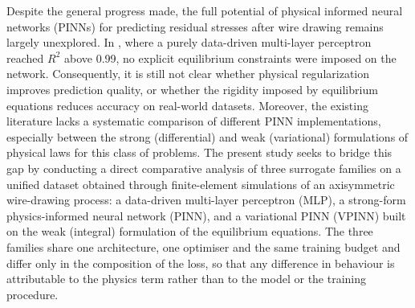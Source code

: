 \documentclass[subscriptcorrection,upint,varvw,barcolor=Goldenrod3,mathalfa=cal=euler,balance,hyphenate,french,pdf-a]{asmejour} %
\begin{document}
Despite the general progress made, the full potential of physical informed neural networks (PINNs) for predicting residual stresses after wire drawing remains largely unexplored. In \citep{demin2025forecasting}, where a purely data-driven multi-layer perceptron reached $R^2$ above 0.99, no explicit equilibrium constraints were imposed on the network.
Consequently, it is still not clear whether physical regularization improves prediction quality, or whether the rigidity imposed by equilibrium equations reduces accuracy on real-world datasets. Moreover, the existing literature lacks a systematic comparison of different PINN implementations, especially between the strong (differential) and weak (variational) formulations of physical laws for this class of problems.
The present study seeks to bridge this gap by conducting a direct comparative analysis of three surrogate families on a unified dataset obtained through finite-element simulations of an axisymmetric wire-drawing process: a data-driven multi-layer perceptron (MLP), a strong-form physics-informed neural network (PINN), and a variational PINN (VPINN) built on the weak (integral) formulation of the equilibrium equations. The three families share one architecture, one optimiser and the same training budget and differ only in the composition of the loss, so that any difference in behaviour is attributable to the physics term rather than to the model or the training procedure.
\end{document}

